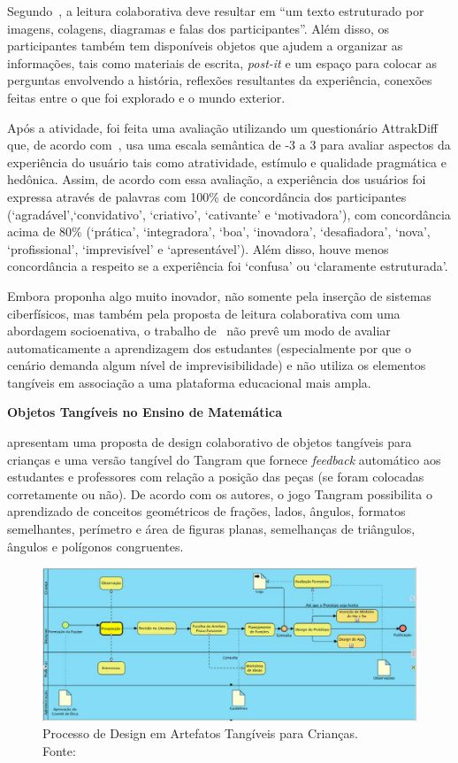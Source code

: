 Segundo~\cite{imamura:2018}, a leitura colaborativa deve resultar em ``um texto estruturado por imagens, colagens, diagramas e falas dos participantes''. Além disso, os participantes também tem disponíveis objetos que ajudem a organizar as informações, tais como materiais de escrita, \textit{post-it} e um espaço para colocar as perguntas envolvendo a história, reflexões resultantes da experiência, conexões feitas entre o que foi explorado e o mundo exterior.

Após a atividade, foi feita uma avaliação utilizando um questionário AttrakDiff que, de acordo com~\cite{imamura:2018}, usa uma escala semântica de -3 a 3 para avaliar aspectos da experiência do usuário tais como atratividade, estímulo e qualidade pragmática e hedônica. Assim, de acordo com essa avaliação, a experiência dos usuários foi expressa através de palavras com 100\% de concordância dos participantes (`agradável',`convidativo', `criativo', `cativante' e `motivadora'), com concordância acima de 80\% (`prática', `integradora', `boa', `inovadora', `desafiadora', `nova', `profissional', `imprevisível' e `apresentável'). Além disso, houve menos concordância a respeito se a experiência foi `confusa' ou `claramente estruturada'.

Embora proponha algo muito inovador, não somente pela inserção de sistemas ciberfísicos, mas também pela proposta de leitura colaborativa com uma abordagem socioenativa, o trabalho de~\cite{imamura:2018}
não prevê um modo de avaliar automaticamente a aprendizagem dos estudantes (especialmente por que o cenário demanda algum nível de imprevisibilidade) e não utiliza os elementos tangíveis em associação a uma plataforma educacional mais ampla.

\textbf{Objetos Tangíveis no Ensino de Matemática}

\cite{lima:2016} apresentam uma proposta de design colaborativo de objetos tangíveis para crianças e uma versão tangível do Tangram que fornece \textit{feedback} automático aos estudantes e professores com relação a posição das peças (se foram colocadas corretamente ou não). De acordo com os autores, o jogo Tangram possibilita o aprendizado de conceitos geométricos de frações, lados, ângulos, formatos semelhantes, perímetro e área de figuras planas, semelhanças de triângulos, ângulos e polígonos congruentes.

\begin{figure}[htb]
	\centering
	\includegraphics[width=1\linewidth]{chapters/works/lima2016.png}
	\captionsetup{justification=centering}	
	\caption{Processo de Design em Artefatos Tangíveis para Crianças. \\Fonte:~\cite{lima:2016}}
	\label{fig:lima2016}
\end{figure}

